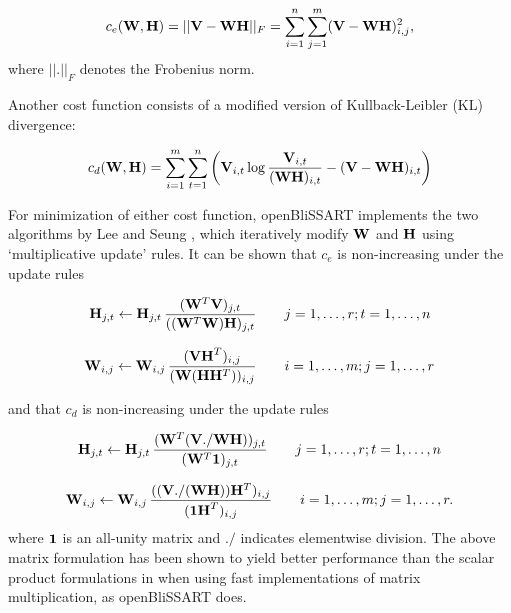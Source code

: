 \begin{equation}
    \label{math:eudist}
    c_e(\mathbf{W},\mathbf{H}) = 
    ||\mathbf{V}-\mathbf{WH}||_F = 
    \sum_{i=1}^n \sum_{j=1}^m (\mathbf{V}-\mathbf{WH})_{i,j}^2 ,
\end{equation}
where $||.||_F$ denotes the Frobenius norm.  

Another cost function consists of a modified version of Kullback-Leibler (KL) divergence:

\begin{equation}
    \label{math:kldiv}
    c_d(\mathbf{W},\mathbf{H}) = \sum\limits_{i=1}^m \sum\limits_{t=1}^n
    \left( \mathbf{V}_{i,t} \log\frac{\mathbf{V}_{i,t}}{(\mathbf{W}\mathbf{H})_{i,t}} - 
    (\mathbf{V} - \mathbf{W}\mathbf{H})_{i,t} \right)
\end{equation}

For minimization of either cost function, openBliSSART implements the two algorithms by
Lee and Seung \cite{LeeSeung2001}, which iteratively modify $\mathbf{W}$ and
$\mathbf{H}$ using `multiplicative update' rules. It can be shown that $c_e$ is
non-increasing under the update rules

\begin{equation}
    \label{math:EDHUpdateRule}
    \mathbf{H}_{j,t} \leftarrow \mathbf{H}_{j,t} \,
    \frac{( \mathbf{W}^T \mathbf{V} )_{j,t}}
         {( (\mathbf{W}^T \mathbf{W})\mathbf{H} )_{j,t}}
    \qquad
    j = 1, \dots, r; t = 1, \dots, n
\end{equation}

\begin{equation}
    \label{math:EDWUpdateRule}
    \mathbf{W}_{i,j} \leftarrow \mathbf{W}_{i,j} \,
    \frac{( \mathbf{VH}^T )_{i,j}}
         {( \mathbf{W} (\mathbf{H}\mathbf{H}^T) )_{i,j}}
    \qquad
     i = 1, \dots, m; j = 1, \dots, r
\end{equation}

\noindent and that $c_d$ is non-increasing under the update rules

\begin{equation}
    \label{math:KLHUpdateRule}
    \mathbf{H}_{j,t} \leftarrow \mathbf{H}_{j,t} \,
    \frac{(\mathbf{W}^T (\mathbf{V} ./ \mathbf{W}\mathbf{H}))_{j,t}}
         {(\mathbf{W}^T \mathbf{1})_{j,t}}
    \qquad
    j = 1, \dots, r; t = 1, \dots, n
\end{equation}

\begin{equation}
    \label{math:KLWUpdateRule}
    \mathbf{W}_{i,j} \leftarrow \mathbf{W}_{i,j} \,
    \frac{((\mathbf{V} ./ (\mathbf{WH})) \mathbf{H}^T)_{i,j}}
         {(\mathbf{1H}^T)_{i,j}}
    \qquad
     i = 1, \dots, m; j = 1, \dots, r .
\end{equation}
where $\mathbf{1}$ is an all-unity matrix and $./$ indicates elementwise division.
The above matrix formulation has been shown to yield better performance than
the scalar product formulations in \cite{LeeSeung2001} when using fast
implementations of matrix multiplication, as openBliSSART does.

